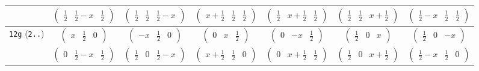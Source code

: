 \documentclass[fleqn,9pt,landscape]{jsarticle}
\begin{document}
\begin{center}
\begin{longtable}{ccccccc}
& $ \begin{pmatrix} \frac{1}{2} & \frac{1}{2} - x & \frac{1}{2} \end{pmatrix} $ & $ \begin{pmatrix} \frac{1}{2} & \frac{1}{2} & \frac{1}{2} - x \end{pmatrix} $ & $ \begin{pmatrix} x + \frac{1}{2} & \frac{1}{2} & \frac{1}{2} \end{pmatrix} $ & $ \begin{pmatrix} \frac{1}{2} & x + \frac{1}{2} & \frac{1}{2} \end{pmatrix} $ & $ \begin{pmatrix} \frac{1}{2} & \frac{1}{2} & x + \frac{1}{2} \end{pmatrix} $ & $ \begin{pmatrix} \frac{1}{2} - x & \frac{1}{2} & \frac{1}{2} \end{pmatrix} $ \\ \hline
{\tt 12g} ({\tt 2..}) & $ \begin{pmatrix} x & \frac{1}{2} & 0 \end{pmatrix} $ & $ \begin{pmatrix} - x & \frac{1}{2} & 0 \end{pmatrix} $ & $ \begin{pmatrix} 0 & x & \frac{1}{2} \end{pmatrix} $ & $ \begin{pmatrix} 0 & - x & \frac{1}{2} \end{pmatrix} $ & $ \begin{pmatrix} \frac{1}{2} & 0 & x \end{pmatrix} $ & $ \begin{pmatrix} \frac{1}{2} & 0 & - x \end{pmatrix} $ \\
& $ \begin{pmatrix} 0 & \frac{1}{2} - x & \frac{1}{2} \end{pmatrix} $ & $ \begin{pmatrix} \frac{1}{2} & 0 & \frac{1}{2} - x \end{pmatrix} $ & $ \begin{pmatrix} x + \frac{1}{2} & \frac{1}{2} & 0 \end{pmatrix} $ & $ \begin{pmatrix} 0 & x + \frac{1}{2} & \frac{1}{2} \end{pmatrix} $ & $ \begin{pmatrix} \frac{1}{2} & 0 & x + \frac{1}{2} \end{pmatrix} $ & $ \begin{pmatrix} \frac{1}{2} - x & \frac{1}{2} & 0 \end{pmatrix} $ \\ \hline

\end{longtable}
\end{center}
\end{document}
